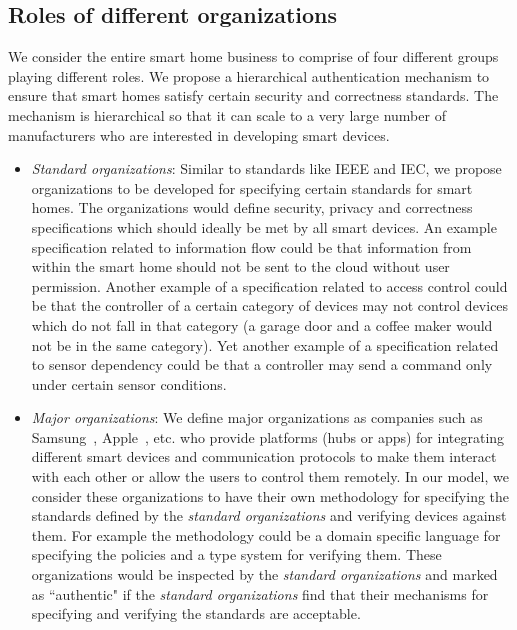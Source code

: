 \documentclass{article}
\begin{document}
\subsection{Roles of different organizations}
\label{subsec:roles}
We consider the entire smart home business to comprise of four different groups playing different roles. We propose a hierarchical authentication mechanism to ensure that smart homes satisfy certain security and correctness standards. The  mechanism is hierarchical so that it can scale to a very large number of manufacturers who are interested in developing smart devices.   
\begin{itemize}[topsep=0pt,itemsep=0ex,partopsep=1ex,parsep=1ex]
\item \textit{Standard organizations}: Similar to standards like IEEE and IEC, we propose organizations to be developed for specifying certain standards for smart homes. The organizations would define security, privacy and correctness specifications which should ideally be met by all smart devices. An example specification related to information flow could be that information from within the smart home should not be sent to the cloud without user permission. Another example of a specification related to access control could be that the controller of a certain category of devices may not control devices which do not fall in that category (a garage door and a coffee maker would not be in the same category). Yet another example of a specification related to sensor dependency could be that a controller may send a command only under certain sensor conditions.
\item \textit{Major organizations}: We define major organizations as companies such as Samsung~\cite{samsung}, Apple~\cite{homekit}, etc. who provide platforms (hubs or apps) for integrating different smart devices and communication protocols to make them interact with each other or allow the users to control them remotely. In our model, we consider these organizations to have their own methodology for specifying the standards defined by the \textit{standard organizations} and verifying devices against them. For example the methodology could be a domain specific language for specifying the policies and a type system for verifying them. 
These organizations would be inspected by the \textit{standard organizations} and marked as ``authentic" if the \textit{standard organizations} find that their mechanisms for specifying and verifying the standards are acceptable.



\end{itemize}
\end{document}
